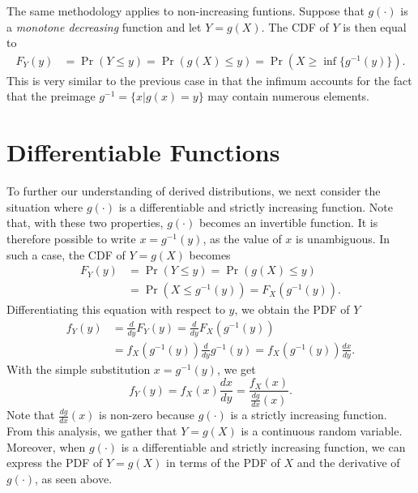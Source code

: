 The same methodology applies to non-increasing funtions.
Suppose that $g(\cdot)$ is a \emph{monotone decreasing} function and let $Y = g(X)$.
The CDF of $Y$ is then equal to
\begin{equation} \label{equation:MonotoneDecreasingCDF}
\begin{split}
F_Y(y) &= \Pr (Y \leq y) = \Pr (g(X) \leq y)
= \Pr \left( X \geq \inf \{ g^{-1} (y) \} \right) .
\end{split}
\end{equation}
This is very similar to the previous case in that the infimum accounts for the fact that the preimage $g^{-1} = \{ x | g(x) = y \}$ may contain numerous elements.


\section{Differentiable Functions}

To further our understanding of derived distributions, we next consider the situation where $g(\cdot)$ is a differentiable and strictly increasing function.
Note that, with these two properties, $g(\cdot)$ becomes an invertible function.
It is therefore possible to write $x = g^{-1} (y)$, as the value of $x$ is unambiguous.
In such a case, the CDF of $Y = g(X)$ becomes
\begin{equation*}
\begin{split}
F_Y(y) &= \Pr (Y \leq y) = \Pr (g(X) \leq y) \\
&= \Pr \left( X \leq g^{-1}(y) \right)
= F_X \left( g^{-1} (y) \right) .
\end{split}
\end{equation*}
Differentiating this equation with respect to $y$, we obtain the PDF of $Y$
\begin{equation*}
\begin{split}
f_Y (y) &= \frac{d}{dy} F_Y(y)
= \frac{d}{dy} F_X \left( g^{-1} (y) \right) \\
&= f_X \left( g^{-1} (y) \right) \frac{d}{dy} g^{-1} (y)
= f_X \left( g^{-1} (y) \right) \frac{dx}{dy} .
\end{split}
\end{equation*}
With the simple substitution $x = g^{-1} (y)$, we get
\begin{equation*}
f_Y (y) = f_X (x) \frac{dx}{dy}
= \frac{f_X (x)}{\frac{dg}{dx}(x)} .
\end{equation*}
Note that $\frac{dg}{dx} (x)$ is non-zero because $g(\cdot)$ is a strictly increasing function.
From this analysis, we gather that $Y=g(X)$ is a continuous random variable.
Moreover, when $g(\cdot)$ is a differentiable and strictly increasing function, we can express the PDF of $Y = g(X)$ in terms of the PDF of $X$ and the derivative of $g(\cdot)$, as seen above.

